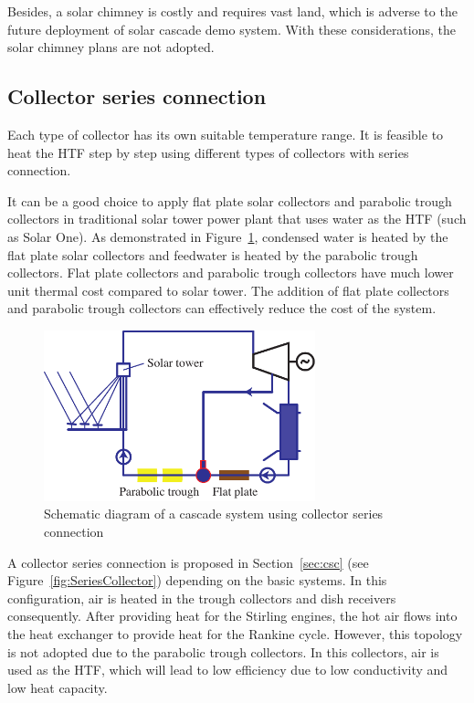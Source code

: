 Besides, a solar chimney is costly and requires vast land, which is adverse to the future deployment of solar cascade demo system. With these considerations, the solar chimney plans are not adopted. 

\subsection{Collector series connection}
Each type of collector has its own suitable temperature range. It is feasible to heat the HTF step by step using different types of collectors with series connection.

It can be a good choice to apply flat plate solar collectors and parabolic trough collectors in traditional solar tower power plant that uses water as the HTF (such as Solar One). As demonstrated in Figure~\ref{fig:seriesCollection}, condensed water is heated by the flat plate solar collectors and feedwater is heated by the parabolic trough collectors. Flat plate collectors and parabolic trough collectors have much lower unit thermal cost compared to solar tower. The addition of flat plate collectors and parabolic trough collectors can effectively reduce the cost of the system.

\begin{figure}[!ht]
\centering 
\includegraphics[width=0.7\textwidth]{fig/SeriesCollection}
\caption{Schematic diagram of a cascade system using collector series connection}\label{fig:seriesCollection}
\end{figure}

A collector series connection is proposed in Section~\ref{sec:csc} (see Figure~\ref{fig:SeriesCollector}) depending on the basic systems. In this configuration, air is heated in the trough collectors and dish receivers consequently. After providing heat for the Stirling engines, the hot air flows into the heat exchanger to provide heat for the Rankine cycle. However, this topology is not adopted due to the parabolic trough collectors. In this collectors, air is used as the HTF, which will lead to low efficiency due to low conductivity and low heat capacity.

